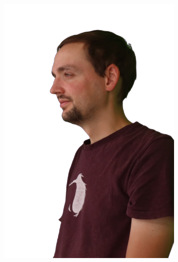 \begin{figure}[!ht]
\begin{subfigure}{0.12\linewidth}
        \includegraphics[width=\textwidth]{Figures/results/initials/simon/26_render.png}
	\end{subfigure}
    \begin{subfigure}{0.12\linewidth}

\end{subfigure}
\end{figure}
